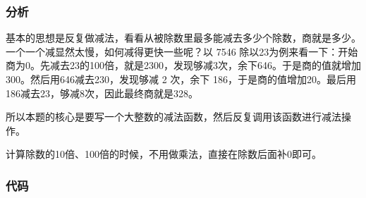 \subsubsection{分析}
基本的思想是反复做减法，看看从被除数里最多能减去多少个除数，商就是多少。一个一个减显然太慢，如何减得更快一些呢？以 7546 除以23为例来看一下：开始商为0。先减去23的100倍，就是2300，发现够减3次，余下646。于是商的值就增加300。然后用646减去230，发现够减 2 次，余下 186，于是商的值增加20。最后用186减去23，够减8次，因此最终商就是328。

所以本题的核心是要写一个大整数的减法函数，然后反复调用该函数进行减法操作。

计算除数的10倍、100倍的时候，不用做乘法，直接在除数后面补0即可。

\subsubsection{代码}
